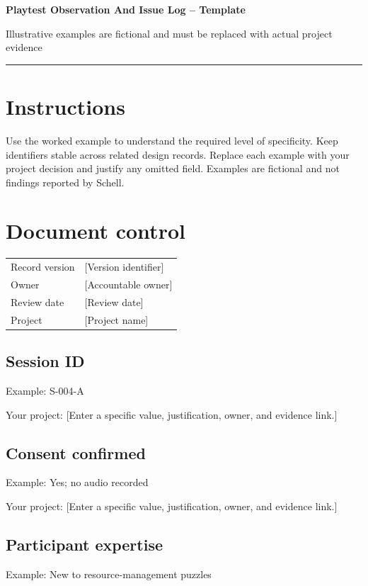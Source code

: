 \documentclass[11pt]{article}
\begin{document}
{\huge\bfseries\color{suiteblue} Playtest Observation And Issue Log -- Template}\par
\vspace{0.15in}
{\normalsize\color{suitegray} Illustrative examples are fictional and must be replaced with actual project evidence}\par
\vspace{0.15in}\hrule\vspace{0.15in}

\section{Instructions}
Use the worked example to understand the required level of specificity. Keep identifiers stable across related design records. Replace each example with your project decision and justify any omitted field. Examples are fictional and not findings reported by Schell.


\section{Document control}
\begin{tabularx}{\linewidth}{@{}lX@{}}\toprule Record version & [Version identifier]\\ Owner & [Accountable owner]\\ Review date & [Review date]\\ Project & [Project name]\\\bottomrule\end{tabularx}

\subsection{Session ID}
Example: S-004-A

Your project: [Enter a specific value, justification, owner, and evidence link.]


\subsection{Consent confirmed}
Example: Yes; no audio recorded

Your project: [Enter a specific value, justification, owner, and evidence link.]


\subsection{Participant expertise}
Example: New to resource-management puzzles
\end{document}
